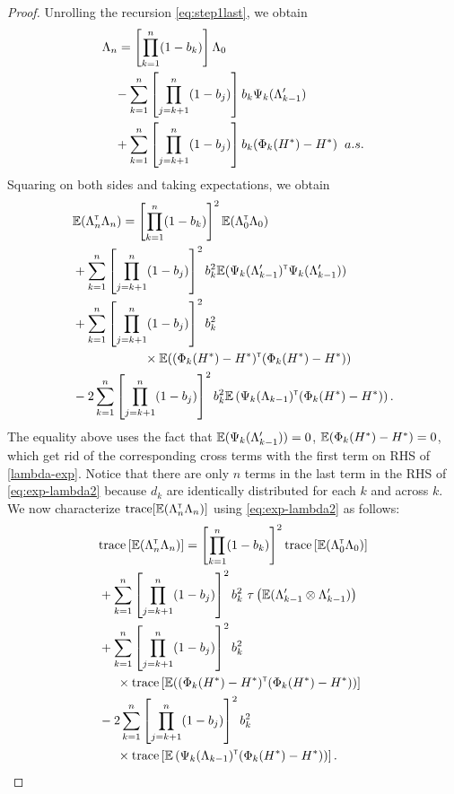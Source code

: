 \begin{proof}
Unrolling the recursion \eqref{eq:step1last}, we obtain 
 \begin{align}\label{lambda-exp}
&  \Lambda_n  = \left[ \prod_{k=1}^n (1-b_k) \right]\Lambda_0 \nonumber\\ 
&\quad- \sum_{k=1}^n \left[\prod_{j=k+1}^n (1-b_j)\right] b_k \Psi_k(\Lambda_{k-1}') \nonumber\\ 
&\quad+ \sum_{k=1}^n \left[\prod_{j=k+1}^n (1-b_j)\right] b_k (\Phi_k(H^*) - H^*) \hspace{0.2cm} a.s.
 \end{align}
Squaring on both sides and taking expectations, we obtain
 \begin{align}
 & \E (\Lambda_n \tr \Lambda_n) =  \left[ \prod_{k=1}^n (1-b_k) \right]^2 \E (\Lambda_0 \tr \Lambda_0)  \nonumber\\ &+ \sum_{k=1}^n \left[\prod_{j=k+1}^n (1-b_j)\right]^2 b_k^2   \E (\Psi_k(\Lambda_{k-1}') \tr \Psi_k(\Lambda_{k-1}'))  \nonumber\\ &+ \sum_{k=1}^n \left[\prod_{j=k+1}^n (1-b_j)\right]^2 b_k^2  \nonumber\\& \hspace{2cm} \times \E ((\Phi_k(H^*) - H^*) \tr  (\Phi_k(H^*) - H^*)) \nonumber\\
&-2 \sum_{k=1}^n \left[\prod_{j=k+1}^n (1-b_j)\right]^2 b_k^2 \E\left(\Psi_k(\Lambda_{k-1}) \tr (\Phi_k(H^*) - H^*)\right).\label{eq:exp-lambda2}
 \end{align}
The equality above uses the fact that $\mathbb{E}(\Psi_k(\Lambda_{k-1}'))=0$, $\mathbb{E}(\Phi_k(H^*) - H^*)=0$, which get rid of the corresponding cross terms with the first term on RHS of \eqref{lambda-exp}. Notice that there are only $n$ terms in the last term in the RHS of \eqref{eq:exp-lambda2} because $d_k$ are identically distributed for each $k$ and across $k$.  
We now characterize $\text{trace}[\mathbb{E}(\Lambda_n^\mathsf{\scriptscriptstyle T} \Lambda_n)]$ using \eqref{eq:exp-lambda2} as follows:
 \begin{align}\label{eq:trace}
 & \text{trace} \left[\E (\Lambda_n \tr \Lambda_n)\right] = \left[ \prod_{k=1}^n (1-b_k) \right]^2 \text{trace} \left[\E (\Lambda_0 \tr \Lambda_0)\right]  \nonumber\\ &+ \sum_{k=1}^n \left[\prod_{j=k+1}^n (1-b_j)\right]^2 b_k^2  \,\,\tau\left(\E (\Lambda_{k-1}' \otimes \Lambda_{k-1}')\right)  \nonumber\\ &+ \sum_{k=1}^n \left[\prod_{j=k+1}^n (1-b_j)\right]^2 b_k^2  \nonumber\\&  \hspace{0.5cm}\times \text{trace}\left[\E ((\Phi_k(H^*) - H^*) \tr  (\Phi_k(H^*) - H^*))\right]  \nonumber\\ &- 2 \sum_{k=1}^n \left[\prod_{j=k+1}^n (1-b_j)\right]^2 b_k^2  \nonumber\\& \hspace{0.5cm} \times \text{trace} \left[\E\left(\Psi_k(\Lambda_{k-1}) \tr (\Phi_k(H^*) - H^*)\right)\right].

\end{align}
\end{proof}
